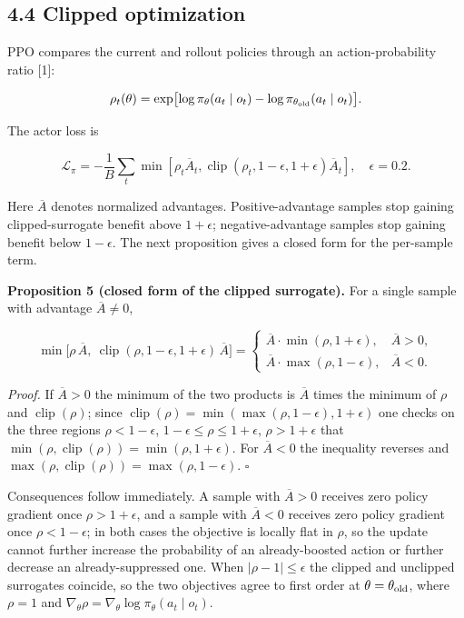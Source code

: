 \documentclass[
  11pt,
]{article}
\begin{document}
\subsection{4.4 Clipped optimization}\label{clipped-optimization}

PPO compares the current and rollout policies through an
action-probability ratio {[}1{]}:

\[
\rho_t(\theta)=\exp\bigl[\log\pi_\theta(a_t\mid o_t)-\log\pi_{\theta_{\rm old}}(a_t\mid o_t)\bigr].
\]

The actor loss is

\[
\mathcal L_\pi=-\frac1B\sum_t
\min\left[\rho_t\overline A_t,
\operatorname{clip}(\rho_t,1-\epsilon,1+\epsilon)\overline A_t\right],
\quad\epsilon=0.2.
\]

Here \(\overline A\) denotes normalized advantages. Positive-advantage
samples stop gaining clipped-surrogate benefit above \(1+\epsilon\);
negative-advantage samples stop gaining benefit below \(1-\epsilon\).
The next proposition gives a closed form for the per-sample term.

\textbf{Proposition 5 (closed form of the clipped surrogate).} For a
single sample with advantage \(\overline A\ne0\),

\[
\min\bigl[\rho\,\overline A,\ \operatorname{clip}(\rho,1-\epsilon,1+\epsilon)\,\overline A\bigr]
=
\begin{cases}
\overline A\cdot\min(\rho,1+\epsilon), & \overline A>0,\\[2pt]
\overline A\cdot\max(\rho,1-\epsilon), & \overline A<0 .
\end{cases}
\]

\emph{Proof.} If \(\overline A>0\) the minimum of the two products is
\(\overline A\) times the minimum of \(\rho\) and
\(\operatorname{clip}(\rho)\); since
\(\operatorname{clip}(\rho)=\min(\max(\rho,1-\epsilon),1+\epsilon)\) one
checks on the three regions \(\rho<1-\epsilon\),
\(1-\epsilon\le\rho\le1+\epsilon\), \(\rho>1+\epsilon\) that
\(\min(\rho,\operatorname{clip}(\rho))=\min(\rho,1+\epsilon)\). For
\(\overline A<0\) the inequality reverses and
\(\max(\rho,\operatorname{clip}(\rho))=\max(\rho,1-\epsilon)\).
\(\square\)

Consequences follow immediately. A sample with \(\overline A>0\)
receives zero policy gradient once \(\rho>1+\epsilon\), and a sample
with \(\overline A<0\) receives zero policy gradient once
\(\rho<1-\epsilon\); in both cases the objective is locally flat in
\(\rho\), so the update cannot further increase the probability of an
already-boosted action or further decrease an already-suppressed one.
When \(|\rho-1|\le\epsilon\) the clipped and unclipped surrogates
coincide, so the two objectives agree to first order at
\(\theta=\theta_{\rm old}\), where \(\rho=1\) and
\(\nabla_\theta\rho=\nabla_\theta\log\pi_\theta(a_t\mid o_t)\).
\end{document}
